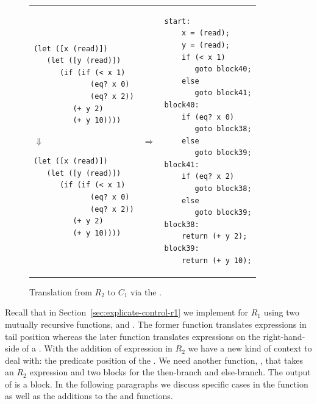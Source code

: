 \documentclass[11pt]{book}
\begin{document}
\begin{figure}[tbp]
\begin{tabular}{lll}
\begin{minipage}{0.4\textwidth}
\begin{lstlisting}
(let ([x (read)])
   (let ([y (read)])
      (if (if (< x 1)
             (eq? x 0)
             (eq? x 2))
         (+ y 2)
         (+ y 10))))
\end{lstlisting}
\hspace{40pt}$\Downarrow$
\begin{lstlisting}
(let ([x (read)])
   (let ([y (read)])
      (if (if (< x 1)
             (eq? x 0)
             (eq? x 2))
         (+ y 2)
         (+ y 10))))
\end{lstlisting}
\end{minipage}
&
$\Rightarrow$
&
\begin{minipage}{0.55\textwidth}
\begin{lstlisting}
start:
    x = (read);
    y = (read);
    if (< x 1)
       goto block40;
    else
       goto block41;
block40:
    if (eq? x 0)
       goto block38;
    else
       goto block39;
block41:
    if (eq? x 2)
       goto block38;
    else
       goto block39;
block38:
    return (+ y 2);
block39:
    return (+ y 10);
\end{lstlisting}
\end{minipage}
\end{tabular} 

\caption{Translation from $R_2$ to $C_1$
  via the .}
\label{fig:explicate-control-s1-38}
\end{figure}



Recall that in Section~\ref{sec:explicate-control-r1} we implement
 for $R_1$ using two mutually recursive
functions,  and .  The
former function translates expressions in tail position whereas the
later function translates expressions on the right-hand-side of a
. With the addition of  expression in $R_2$ we have a
new kind of context to deal with: the predicate position of the
. We need another function, , that takes
an $R_2$ expression and two blocks for the then-branch and
else-branch. The output of  is a block.
%
%
In the following paragraphs we discuss specific cases in the
 function as well as the additions to the
 and  functions.
\end{document}
